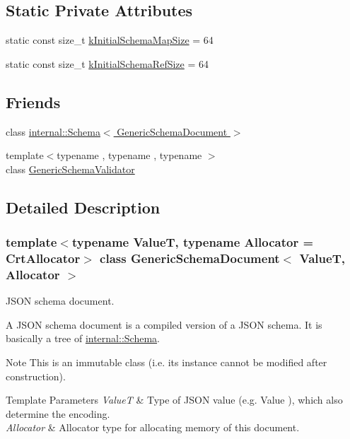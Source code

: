 \subsection*{Static Private Attributes}
\begin{DoxyCompactItemize}
\item 
static const size\+\_\+t \hyperlink{classGenericSchemaDocument_a3b0a57801ee25f2ba84ce61770291c33}{k\+Initial\+Schema\+Map\+Size} = 64
\item 
static const size\+\_\+t \hyperlink{classGenericSchemaDocument_a5a3e961495b724dc65682d6a0a681d03}{k\+Initial\+Schema\+Ref\+Size} = 64
\end{DoxyCompactItemize}
\subsection*{Friends}
\begin{DoxyCompactItemize}
\item 
class \hyperlink{classGenericSchemaDocument_a706511849688d9245fc37109f02a03c4}{internal\+::\+Schema$<$ Generic\+Schema\+Document $>$}
\item 
{\footnotesize template$<$typename , typename , typename $>$ }\\class \hyperlink{classGenericSchemaDocument_afcc03e6ba8f1a819e1a028c31ad38347}{Generic\+Schema\+Validator}
\end{DoxyCompactItemize}


\subsection{Detailed Description}
\subsubsection*{template$<$typename ValueT, typename Allocator = Crt\+Allocator$>$\newline
class Generic\+Schema\+Document$<$ Value\+T, Allocator $>$}

J\+S\+ON schema document. 

A J\+S\+ON schema document is a compiled version of a J\+S\+ON schema. It is basically a tree of \hyperlink{classinternal_1_1Schema}{internal\+::\+Schema}.

\begin{DoxyNote}{Note}
This is an immutable class (i.\+e. its instance cannot be modified after construction). 
\end{DoxyNote}

\begin{DoxyTemplParams}{Template Parameters}
{\em ValueT} & Type of J\+S\+ON value (e.\+g. {\ttfamily Value} ), which also determine the encoding. \\
\hline
{\em Allocator} & Allocator type for allocating memory of this document. \\
\hline
\end{DoxyTemplParams}


